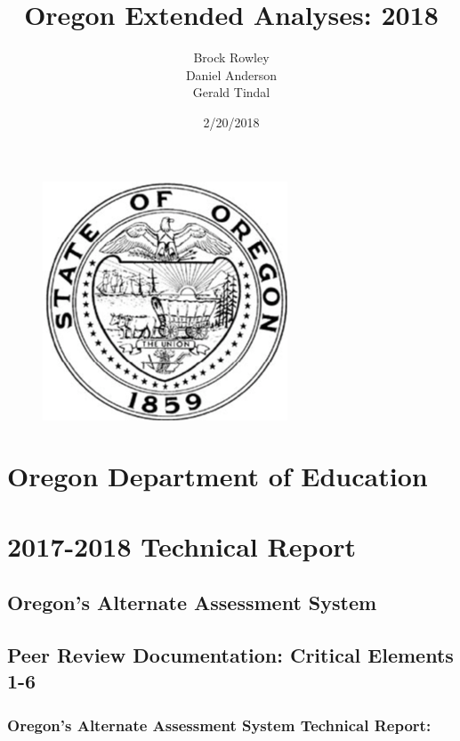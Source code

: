 \documentclass[]{article}
\title{Oregon Extended Analyses: 2018}
\author{Brock Rowley \\ Daniel Anderson \\ Gerald Tindal}
\date{2/20/2018}
\begin{document}
\maketitle

{
\setcounter{tocdepth}{4}
\tableofcontents
}
\newpage

\begin{figure}
\centering
\includegraphics{img/stateofOR.png}
\caption{}
\end{figure}

\section{Oregon Department of
Education}\label{oregon-department-of-education}

\section{2017-2018 Technical Report}\label{technical-report}

\subsection{Oregon's Alternate Assessment
System}\label{oregons-alternate-assessment-system}

\subsection{Peer Review Documentation: Critical Elements
1-6}\label{peer-review-documentation-critical-elements-1-6}

\subsubsection{Oregon's Alternate Assessment System Technical
Report:}\label{oregons-alternate-assessment-system-technical-report}
\end{document}
